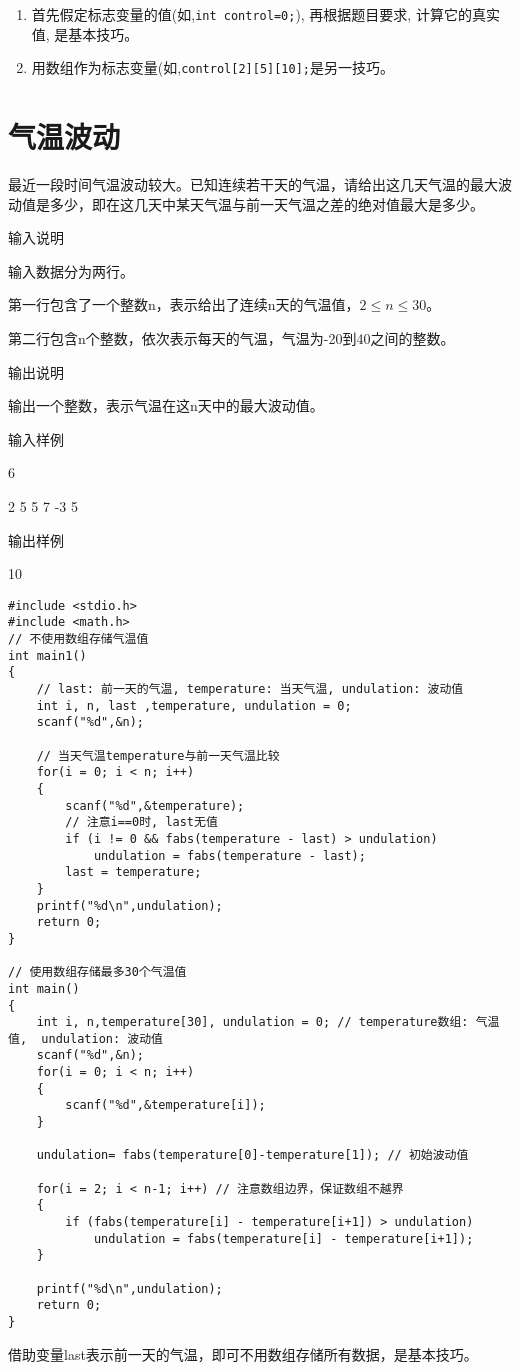 \begin{note}[要点]
	\begin{enumerate}
		\item 首先假定标志变量的值(如,\lstinline|int control=0;|), 再根据题目要求, 计算它的真实值, 是基本技巧。
		\item 用数组作为标志变量(如,\lstinline|control[2][5][10];|是另一技巧。
	\end{enumerate}	
\end{note}

\section{气温波动}	
最近一段时间气温波动较大。已知连续若干天的气温，请给出这几天气温的最大波动值是多少，即在这几天中某天气温与前一天气温之差的绝对值最大是多少。

输入说明	

输入数据分为两行。

第一行包含了一个整数n，表示给出了连续n天的气温值，$2\le n\le 30$。

第二行包含n个整数，依次表示每天的气温，气温为-20到40之间的整数。

输出说明

输出一个整数，表示气温在这n天中的最大波动值。

输入样例	

6

2 5 5 7 -3 5

输出样例

10

\begin{lstlisting}
#include <stdio.h>
#include <math.h>
// 不使用数组存储气温值
int main1()
{
	// last: 前一天的气温, temperature: 当天气温, undulation: 波动值 
	int i, n, last ,temperature, undulation = 0;
	scanf("%d",&n);
	
	// 当天气温temperature与前一天气温比较
	for(i = 0; i < n; i++)
	{
		scanf("%d",&temperature);
		// 注意i==0时, last无值
		if (i != 0 && fabs(temperature - last) > undulation) 
			undulation = fabs(temperature - last);
		last = temperature;
	} 
	printf("%d\n",undulation); 
	return 0;
} 

// 使用数组存储最多30个气温值 
int main()
{
	int i, n,temperature[30], undulation = 0; // temperature数组: 气温值,  undulation: 波动值 
	scanf("%d",&n);
	for(i = 0; i < n; i++)
	{
		scanf("%d",&temperature[i]);
	} 
	
	undulation= fabs(temperature[0]-temperature[1]); // 初始波动值
	
	for(i = 2; i < n-1; i++) // 注意数组边界，保证数组不越界 
	{
		if (fabs(temperature[i] - temperature[i+1]) > undulation) 
			undulation = fabs(temperature[i] - temperature[i+1]);
	} 
	
	printf("%d\n",undulation); 
	return 0;
} 
\end{lstlisting}

\begin{note}
	借助变量last表示前一天的气温，即可不用数组存储所有数据，是基本技巧。
\end{note}
